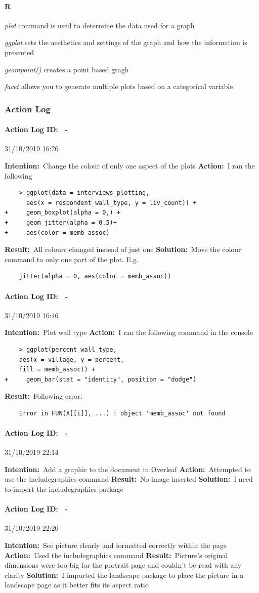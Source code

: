 \documentclass[12pt]{article}
\newcounter{problem} \setcounter{problem}{1}
\newcommand{\actionlog}[1]{\paragraph{Action Log ID: \theproblem\ -}{#1} ~\\ \addtocounter{problem}{1}}
\newcommand{\intention}[1]{\textbf{Intention:}{\textnormal\ #1} \newline}
\newcommand{\action}[1]{\textbf{Action:}{\textnormal\ #1} \newline}
\newcommand{\result}[1]{\textbf{Result:}{\textnormal\ #1} \newline}
\newcommand{\solution}[1]{\textbf{Solution:}{\textnormal\ #1} \newline}
\newcommand{\learning}[2]{\item \textit{#1} \textnormal{#2}}
\begin{document}
\paragraph{R}
\learning{plot}{command is used to determine the data used for a graph}
\learning{ggplot}{sets the aesthetics and settings of the graph and how the information is presented}
\learning{geompoint()}{creates a point based gragh}
\learning{facet}{allows you to generate multiple plots based on a categorical variable}

\subsubsection{Action Log}

\actionlog{31/10/2019 16:26}
\intention{Change the colour of only one aspect of the plots}
\action{I ran the following}
\begin{verbatim}
    > ggplot(data = interviews_plotting, 
      aes(x = respondent_wall_type, y = liv_count)) +
+     geom_boxplot(alpha = 0,) +
+     geom_jitter(alpha = 0.5)+
+     aes(color = memb_assoc)
\end{verbatim}
\result{All colours changed instead of just one}
\solution{Move the colour command to only one part of the plot. E.g.}
\begin{verbatim}
    jitter(alpha = 0, aes(color = memb_assoc))
\end{verbatim}
\actionlog{31/10/2019 16:46}
\intention{Plot wall type}
\action{I ran the following command in the console}
\begin{verbatim}
    > ggplot(percent_wall_type, 
    aes(x = village, y = percent, 
    fill = memb_assoc)) +
+     geom_bar(stat = "identity", position = "dodge")
\end{verbatim}
\result{Following error:}
\begin{verbatim}
    Error in FUN(X[[i]], ...) : object 'memb_assoc' not found
\end{verbatim}

\actionlog{31/10/2019 22:14}
\intention{Add a graphic to the document in Overleaf}
\action{Attempted to use the includegraphics command}
\result{No image inserted}
\solution{I need to import the includegraphics package}

\actionlog{31/10/2019 22:20}
\intention{See picture clearly and formatted correctly within the page}
\action{Used the includegraphics command}
\result{Picture's original dimensions were too big for the portrait page and couldn't be read with any clarity}
\solution{I imported the landscape package to place the picture in a landscape page as it better fits its aspect ratio}
\end{document}
